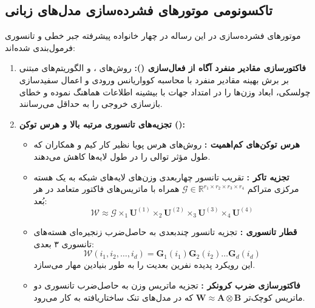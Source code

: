\documentclass[12pt,a4paper]{report}
\theoremstyle{definition}
\begin{document}
\subsection{تاکسونومی موتورهای فشرده‌سازی مدل‌های زبانی}
\label{sec:compression_taxonomy}
موتورهای فشرده‌سازی در این رساله در چهار خانواده پیشرفته جبر خطی و تانسوری فرمول‌بندی شده‌اند:
\begin{enumerate}
    \item \textbf{فاکتورسازی مقادیر منفرد آگاه از فعال‌سازی ():} روش‌های  \cite{yuan2023asvd}،  \cite{wang2024svdllm} و الگوریتم‌های مبتنی بر برش بهینه مقادیر منفرد با محاسبه کوواریانس ورودی و اعمال سفیدسازی چولسکی، ابعاد وزن‌ها را در امتداد جهات با بیشینه اطلاعات هماهنگ نموده و خطای بازسازی خروجی را به حداقل می‌رسانند.
    \item \textbf{تجزیه‌های تانسوری مرتبه بالا و هرس توکن ():}
    \begin{itemize}
        \item \textbf{هرس توکن‌های کم‌اهمیت :} روش‌های هرس پویا نظیر کار کیم و همکاران \cite{kim2022learned} که طول مؤثر توالی را در طول لایه‌ها کاهش می‌دهند.
        \item \textbf{تجزیه تاکر :} تقریب تانسور چهاربعدی وزن‌های لایه‌های شبکه به یک هسته مرکزی متراکم $\mathcal{G} \in \mathbb{R}^{r_1 \times r_2 \times r_3 \times r_4}$ همراه با ماتریس‌های فاکتور متعامد در هر بُعد:
        \begin{equation}
        \mathcal{W} \approx \mathcal{G} \times_1 \mathbf{U}^{(1)} \times_2 \mathbf{U}^{(2)} \times_3 \mathbf{U}^{(3)} \times_4 \mathbf{U}^{(4)}
        \end{equation}
        \item \textbf{قطار تانسوری :} تجزیه تانسور چندبعدی به حاصل‌ضرب زنجیره‌ای هسته‌های تانسوری ۳ بعدی:
        \begin{equation}
        \mathcal{W}(i_1, i_2, \dots, i_d) = \mathbf{G}_1(i_1) \mathbf{G}_2(i_2) \dots \mathbf{G}_d(i_d)
        \end{equation}
        این رویکرد پدیده نفرین بعدیت  را به طور بنیادین مهار می‌سازد.
        \item \textbf{فاکتورسازی ضرب کرونکر :} تجزیه ماتریس وزن به حاصل‌ضرب تانسوری دو ماتریس کوچک‌تر $\mathbf{W} \approx \mathbf{A} \otimes \mathbf{B}$ که در مدل‌های تنک ساختاریافته به کار می‌رود.
    \end{itemize}

\end{enumerate}
\end{document}
